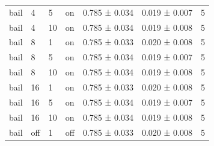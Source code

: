 \begin{table}[t]
\begin{tabular}{lllllll}
bail & 4 & 5 & on & 0.785 ± 0.034 & 0.019 ± 0.007 & 5 \\
bail & 4 & 10 & on & 0.785 ± 0.034 & 0.019 ± 0.008 & 5 \\
bail & 8 & 1 & on & 0.785 ± 0.033 & 0.020 ± 0.008 & 5 \\
bail & 8 & 5 & on & 0.785 ± 0.034 & 0.019 ± 0.007 & 5 \\
bail & 8 & 10 & on & 0.785 ± 0.034 & 0.019 ± 0.008 & 5 \\
bail & 16 & 1 & on & 0.785 ± 0.033 & 0.020 ± 0.008 & 5 \\
bail & 16 & 5 & on & 0.785 ± 0.034 & 0.019 ± 0.007 & 5 \\
bail & 16 & 10 & on & 0.785 ± 0.034 & 0.019 ± 0.008 & 5 \\
bail & off & 1 & off & 0.785 ± 0.033 & 0.020 ± 0.008 & 5 \\
\bottomrule
\end{tabular}
\label{tab:e5_privacy}
\end{table}
